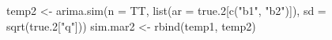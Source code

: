 \begin{Schunk}
\begin{Sinput}
 temp2 <- arima.sim(n = TT, list(ar = true.2[c("b1", "b2")]), sd = sqrt(true.2["q"]))
 sim.mar2 <- rbind(temp1, temp2)
\end{Sinput}
\end{Schunk}
